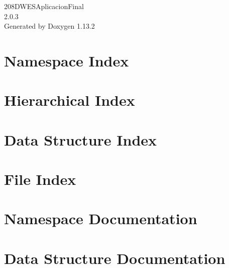 \documentclass[twoside]{book}
\newcommand{\+}{\discretionary{\mbox{\scriptsize$\hookleftarrow$}}{}{}}
\newcommand{\clearemptydoublepage}{%
    \newpage{\pagestyle{empty}\cleardoublepage}%
  }
\begin{document}
  \raggedbottom
  \begin{titlepage}
  \vspace*{7cm}
  \begin{center}%
  {\Large 208\+DWESAplicacion\+Final}\\
  [1ex]\large 2.\+0.\+3 \\
  \vspace*{1cm}
  {\large Generated by Doxygen 1.13.2}\\
  \end{center}
  \end{titlepage}
  \clearemptydoublepage
  \tableofcontents
  \clearemptydoublepage

\chapter{Namespace Index}

\chapter{Hierarchical Index}

\chapter{Data Structure Index}

\chapter{File Index}

\chapter{Namespace Documentation}

\chapter{Data Structure Documentation}












\end{document}
